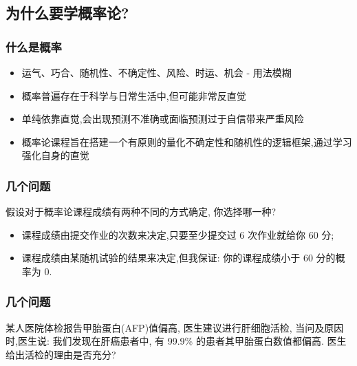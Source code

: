 \subsection{为什么要学概率论?}

\begin{frame}
	\frametitle{什么是概率}


		\begin{itemize}[<+-|alert@+>]
			\item 运气、巧合、随机性、不确定性、风险、时运、机会 - 用法模糊
			\item 概率普遍存在于科学与日常生活中,但可能非常反直觉
			\item 单纯依靠直觉,会出现预测不准确或面临预测过于自信带来严重风险
			\item 概率论课程旨在搭建一个有原则的量化不确定性和随机性的逻辑框架,通过学习强化自身的直觉
		\end{itemize}




\end{frame}





\begin{frame}
	\frametitle{几个问题}
	\begin{prob}
		假设对于概率论课程成绩有两种不同的方式确定, 你选择哪一种?
		\begin{itemize}[<+-|alert@+>]
			\item 课程成绩由提交作业的次数来决定,只要至少提交过 6 次作业就给你 60 分;
			\item 课程成绩由某随机试验的结果来决定,但我保证: 你的课程成绩小于 60 分的概率为 0.
		\end{itemize}

	\end{prob}


\end{frame}


\begin{frame}
	\frametitle{几个问题}

	\begin{prob} 某人医院体检报告甲胎蛋白({\rm AFP})值偏高, 医生建议进行肝细胞活检, 当问及原因时,医生说: 我们发现在肝癌患者中, 有 99.9\% 的患者其甲胎蛋白数值都偏高.  医生给出活检的理由是否充分?
	\end{prob}
\end{frame}


